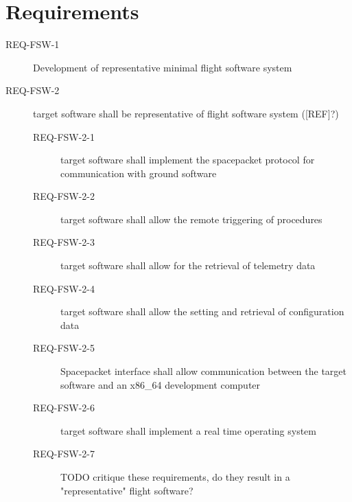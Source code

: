 \documentclass[../report.tex]{subfiles}
\begin{document}
\section{Requirements}

\begin{description}
    \item[REQ-FSW-1]Development of representative minimal flight software system
    \item[REQ-FSW-2]target software shall be representative of flight software system ([REF]?)
    \begin{description}
        \item[REQ-FSW-2-1]target software shall implement the spacepacket protocol for communication with ground software
        \item[REQ-FSW-2-2]target software shall allow the remote triggering of procedures
        \item[REQ-FSW-2-3]target software shall allow for the retrieval of telemetry data
        \item[REQ-FSW-2-4]target software shall allow the setting and retrieval of configuration data
        \item[REQ-FSW-2-5]Spacepacket interface shall allow communication between the target software and an x86\_64 development computer
        \item[REQ-FSW-2-6]target software shall implement a real time operating system
        \item[REQ-FSW-2-7]TODO critique these requirements, do they result in a "representative" flight software?


\end{description}
\end{description}
\end{document}
